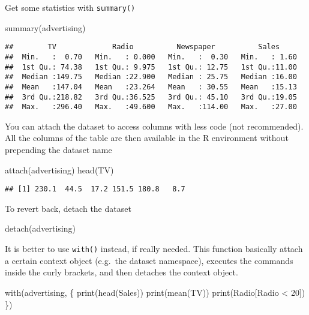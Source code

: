 \documentclass[
  oneside]{book}
\newenvironment{Shaded}{\begin{snugshade}}{\end{snugshade}}
\newcommand{\DecValTok}[1]{\textcolor[rgb]{0.00,0.00,0.81}{#1}}
\newcommand{\FunctionTok}[1]{\textcolor[rgb]{0.00,0.00,0.00}{#1}}
\newcommand{\NormalTok}[1]{#1}
\newcommand{\SpecialCharTok}[1]{\textcolor[rgb]{0.00,0.00,0.00}{#1}}
\begin{document}
Get some statistics with \texttt{summary()}

\begin{Shaded}
\begin{Highlighting}[]
\FunctionTok{summary}\NormalTok{(advertising)}
\end{Highlighting}
\end{Shaded}

\begin{verbatim}
##        TV             Radio          Newspaper          Sales      
##  Min.   :  0.70   Min.   : 0.000   Min.   :  0.30   Min.   : 1.60  
##  1st Qu.: 74.38   1st Qu.: 9.975   1st Qu.: 12.75   1st Qu.:11.00  
##  Median :149.75   Median :22.900   Median : 25.75   Median :16.00  
##  Mean   :147.04   Mean   :23.264   Mean   : 30.55   Mean   :15.13  
##  3rd Qu.:218.82   3rd Qu.:36.525   3rd Qu.: 45.10   3rd Qu.:19.05  
##  Max.   :296.40   Max.   :49.600   Max.   :114.00   Max.   :27.00
\end{verbatim}

You can attach the dataset to access columns with less code
(not recommended). All the columns of the table are then
available in the R environment without prepending the dataset name

\begin{Shaded}
\begin{Highlighting}[]
\FunctionTok{attach}\NormalTok{(advertising)}
\FunctionTok{head}\NormalTok{(TV)}
\end{Highlighting}
\end{Shaded}

\begin{verbatim}
## [1] 230.1  44.5  17.2 151.5 180.8   8.7
\end{verbatim}

To revert back, detach the dataset

\begin{Shaded}
\begin{Highlighting}[]
\FunctionTok{detach}\NormalTok{(advertising)}
\end{Highlighting}
\end{Shaded}

It is better to use \texttt{with()} instead, if really needed.
This function basically attach a certain context object
(e.g.~the dataset namespace), executes the commands inside
the curly brackets, and then detaches the context object.

\begin{Shaded}
\begin{Highlighting}[]
\FunctionTok{with}\NormalTok{(advertising, \{}
  \FunctionTok{print}\NormalTok{(}\FunctionTok{head}\NormalTok{(Sales))}
  \FunctionTok{print}\NormalTok{(}\FunctionTok{mean}\NormalTok{(TV))}
  \FunctionTok{print}\NormalTok{(Radio[Radio }\SpecialCharTok{\textless{}} \DecValTok{20}\NormalTok{])}
\NormalTok{\})}
\end{Highlighting}
\end{Shaded}
\end{document}
